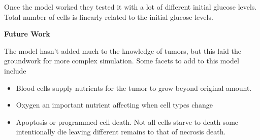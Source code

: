 \documentclass{article}
\newcommand\tab[1][1cm]{\hspace*{#1}}
\begin{document}
\begin{multicols}{2}
      \tab Once the model worked they tested it with a lot of different initial glucose levels.  Total number of cells is linearly related to the initial glucose levels.
      \begin{center}\large\textbf{Future Work}\end{center}
      \tab The model hasn't added much to the knowledge of tumors, but this laid the groundwork for more complex simulation.
      Some facets to add to this model include
      \begin{itemize}
         \item Blood cells supply nutrients for the tumor to grow beyond original amount.
         \item Oxygen an important nutrient affecting when cell types change
         \item Apoptosis or programmed cell death.  Not all cells starve to death some intentionally die leaving different remains to that of necrosis death.
      \end{itemize}
   \end{multicols}
\end{document}
